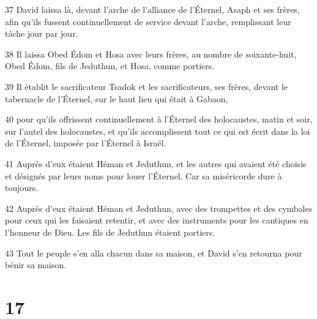 \par 37 David laissa là, devant l'arche de l'alliance de l'Éternel, Asaph et ses frères, afin qu'ils fussent continuellement de service devant l'arche, remplissant leur tâche jour par jour.
\par 38 Il laissa Obed Édom et Hosa avec leurs frères, au nombre de soixante-huit, Obed Édom, fils de Jeduthun, et Hosa, comme portiers.
\par 39 Il établit le sacrificateur Tsadok et les sacrificateurs, ses frères, devant le tabernacle de l'Éternel, sur le haut lieu qui était à Gabaon,
\par 40 pour qu'ils offrissent continuellement à l'Éternel des holocaustes, matin et soir, sur l'autel des holocaustes, et qu'ils accomplissent tout ce qui est écrit dans la loi de l'Éternel, imposée par l'Éternel à Israël.
\par 41 Auprès d'eux étaient Héman et Jeduthun, et les autres qui avaient été choisis et désignés par leurs noms pour louer l'Éternel. Car sa miséricorde dure à toujours.
\par 42 Auprès d'eux étaient Héman et Jeduthun, avec des trompettes et des cymbales pour ceux qui les faisaient retentir, et avec des instruments pour les cantiques en l'honneur de Dieu. Les fils de Jeduthun étaient portiers.
\par 43 Tout le peuple s'en alla chacun dans sa maison, et David s'en retourna pour bénir sa maison.

\chapter{17}

